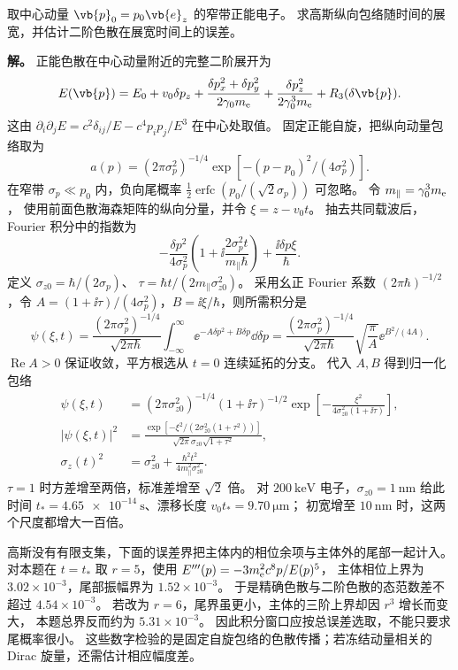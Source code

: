 \begin{exbox}[窄带高斯波包与三阶相位余项]
\label{sec:feqo-dispersion-expansion}
取中心动量 $\vb{p}_0=p_0\vb{e}_z$ 的窄带正能电子。
求高斯纵向包络随时间的展宽，并估计二阶色散在展宽时间上的误差。

\textbf{解。} 正能色散在中心动量附近的完整二阶展开为
\begin{equation}
E(\vb{p})=E_0+v_0\delta p_z+
\frac{\delta p_x^2+\delta p_y^2}{2\gamma_0m_{\rm e}}
+\frac{\delta p_z^2}{2\gamma_0^3m_{\rm e}}+R_3(\delta\vb{p}).
\label{eq:feqo-dispersion-hessian}
\end{equation}
这由 $\partial_i\partial_jE=c^2\delta_{ij}/E-c^4p_ip_j/E^3$ 在中心处取值。
固定正能自旋，把纵向动量包络取为
\begin{equation}
a(p)=(2\pi\sigma_p^2)^{-1/4}
\exp[-(p-p_0)^2/(4\sigma_p^2)].
\label{eq:feqo-gaussian-momentum}
\end{equation}
在窄带 $\sigma_p\ll p_0$ 内，负向尾概率
$\tfrac12\operatorname{erfc}(p_0/(\sqrt2\sigma_p))$ 可忽略。
令 $m_\parallel=\gamma_0^3m_{\rm e}$，
使用前面色散海森矩阵的纵向分量，并令 $\xi=z-v_0t$。
抽去共同载波后，Fourier 积分中的指数为
\[
-\frac{\delta p^2}{4\sigma_p^2}
\left(1+\ii\frac{2\sigma_p^2t}{m_\parallel\hbar}\right)
+\frac{\ii\delta p\xi}{\hbar}.
\]
定义 $\sigma_{z0}=\hbar/(2\sigma_p)$、
$\tau=\hbar t/(2m_\parallel\sigma_{z0}^2)$。
采用幺正 Fourier 系数 $(2\pi\hbar)^{-1/2}$，令
$A=(1+\ii\tau)/(4\sigma_p^2)$，$B=\ii\xi/\hbar$，则所需积分是
\[
\psi(\xi,t)=\frac{(2\pi\sigma_p^2)^{-1/4}}{\sqrt{2\pi\hbar}}
\int_{-\infty}^{\infty}\ee^{-A\delta p^2+B\delta p}\dd\delta p
=\frac{(2\pi\sigma_p^2)^{-1/4}}{\sqrt{2\pi\hbar}}
\sqrt{\frac\pi A}\ee^{B^2/(4A)}.
\]
$\operatorname{Re}A>0$ 保证收敛，平方根选从 $t=0$ 连续延拓的分支。
代入 $A,B$ 得到归一化包络
\begin{align}
\psi(\xi,t)&=(2\pi\sigma_{z0}^2)^{-1/4}(1+\ii\tau)^{-1/2}
\exp\left[-\frac{\xi^2}{4\sigma_{z0}^2(1+\ii\tau)}\right],\label{eq:feqo-gaussian-prop-result}\\
|\psi(\xi,t)|^2&=
\frac{\exp[-\xi^2/(2\sigma_{z0}^2(1+\tau^2))]}
{\sqrt{2\pi}\sigma_{z0}\sqrt{1+\tau^2}},\label{eq:feqo-gaussian-density}\\
\sigma_z(t)^2&=\sigma_{z0}^2+
\frac{\hbar^2t^2}{4m_\parallel^2\sigma_{z0}^2}.\label{eq:feqo-gaussian-spreading}
\end{align}
$\tau=1$ 时方差增至两倍，标准差增至 $\sqrt2$ 倍。
对 $\SI{200}{\kilo\electronvolt}$ 电子，$\sigma_{z0}=\SI{1}{\nano\metre}$
给此时间 $t_*=\SI{4.65e-14}{\second}$、漂移长度 $v_0t_*=\SI{9.70}{\micro\metre}$；
初宽增至 $\SI{10}{\nano\metre}$ 时，这两个尺度都增大一百倍。

高斯没有有限支集，下面的误差界把主体内的相位余项与主体外的尾部一起计入。
对本题在 $t=t_*$ 取 $r=5$，使用
$E'''(p)=-3m_{\rm e}^2c^8p/E(p)^5$，
主体相位上界为 $3.02\times10^{-3}$，尾部振幅界为 $1.52\times10^{-3}$。
于是精确色散与二阶色散的态范数差不超过 $4.54\times10^{-3}$。
若改为 $r=6$，尾界虽更小，主体的三阶上界却因 $r^3$ 增长而变大，
本题总界反而约为 $5.31\times10^{-3}$。
因此积分窗口应按总误差选取，不能只要求尾概率很小。
这些数字检验的是固定自旋包络的色散传播；若冻结动量相关的 Dirac 旋量，还需估计相应幅度差。
\end{exbox}

